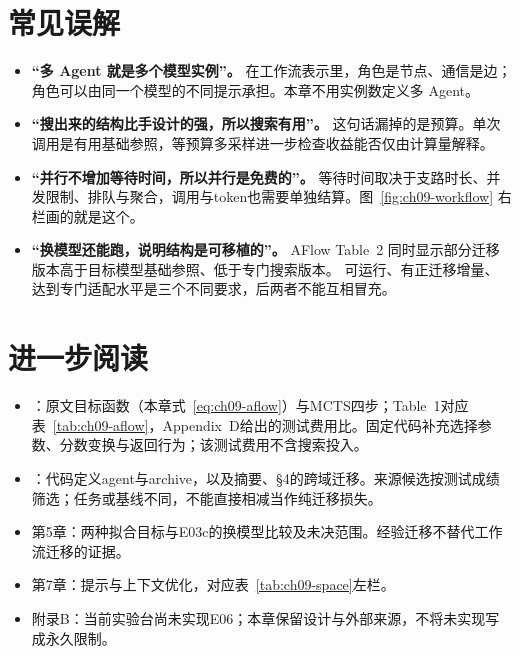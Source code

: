 \section*{常见误解}
\begin{itemize}
  \item \textbf{``多 Agent 就是多个模型实例''。}
        在工作流表示里，角色是节点、通信是边；
        角色可以由同一个模型的不同提示承担。本章不用实例数定义多 Agent。
  \item \textbf{``搜出来的结构比手设计的强，所以搜索有用''。}
        这句话漏掉的是预算。单次调用是有用基础参照，等预算多采样进一步检查收益能否仅由计算量解释。
  \item \textbf{``并行不增加等待时间，所以并行是免费的''。}
        等待时间取决于支路时长、并发限制、排队与聚合，调用与token也需要单独结算。图~\ref{fig:ch09-workflow} 右栏画的就是这个。
  \item \textbf{``换模型还能跑，说明结构是可移植的''。}
        AFlow Table~2 同时显示部分迁移版本高于目标模型基础参照、低于专门搜索版本\cite{aflow-2410}。
        可运行、有正迁移增量、达到专门适配水平是三个不同要求，后两者不能互相冒充。
\end{itemize}

\section*{进一步阅读}
\begin{itemize}
  \item \cite{aflow-2410,aflow-code-2025}：原文目标函数（本章式~\eqref{eq:ch09-aflow}）与MCTS四步；Table~1对应表~\ref{tab:ch09-aflow}，Appendix~D给出的测试费用比。固定代码补充选择参数、分数变换与返回行为；该测试费用不含搜索投入。
  \item \cite{adas-2408}：代码定义agent与archive，以及摘要、§4的跨域迁移。来源候选按测试成绩筛选；任务或基线不同，不能直接相减当作纯迁移损失。
  \item 第5章：两种拟合目标与E03c的换模型比较及未决范围。经验迁移不替代工作流迁移的证据。
  \item 第7章：提示与上下文优化，对应表~\ref{tab:ch09-space}左栏。
  \item 附录B：当前实验台尚未实现E06；本章保留设计与外部来源，不将未实现写成永久限制。
\end{itemize}
